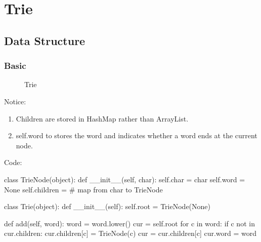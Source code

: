 \chapter{Trie}


\section{Data Structure}
\subsection{Basic}

\begin{figure}[hbtp]
\centering
{}
\caption{Trie}
\label{fig:trie} 
\end{figure}

Notice:
\begin{enumerate}
\item Children are stored in HashMap rather than ArrayList. 
\item self.word to stores the word and indicates whether a word ends at the current node. 
\end{enumerate}
Code: 
\begin{python}
class TrieNode(object):
    def __init__(self, char):
        self.char = char
        self.word = None
        self.children = {}  # map from char to TrieNode


class Trie(object):
    def __init__(self):
        self.root = TrieNode(None)

    def add(self, word):
        word = word.lower()
        cur = self.root
        for c in word:
            if c not in cur.children:
                cur.children[c] = TrieNode(c)
            cur = cur.children[c]
        cur.word = word
\end{python}

